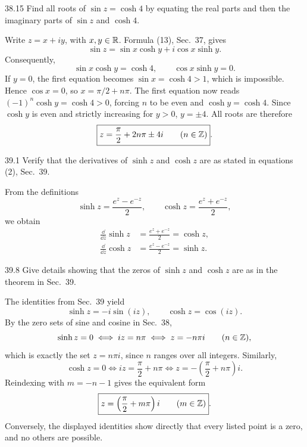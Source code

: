 \documentclass[11pt,oneside]{article}
\begin{document}
\begin{exercise}{38.15}
Find all roots of \(\sin z=\cosh4\) by equating the real parts and then the imaginary parts of \(\sin z\) and \(\cosh4\).
\end{exercise}

\begin{solution}
Write \(z=x+iy\), with \(x, y\in\mathbb{R}\). Formula (13), Sec.~37, gives
\[
    \sin z=\sin x\cosh y+i\cos x\sinh y.
\]
Consequently,
\[
    \sin x\cosh y=\cosh4,
    \qquad \cos x\sinh y=0.
\]
If \(y=0\), the first equation becomes \(\sin x=\cosh4>1\), which is impossible. Hence \(\cos x=0\), so \(x=\pi/2+n\pi\). The first equation now reads \((-1)^n\cosh y=\cosh4>0\), forcing \(n\) to be even and \(\cosh y=\cosh4\). Since \(\cosh y\) is even and strictly increasing for \(y>0\), \(y=\pm4\). All roots are therefore
\[
    \boxed{z=\frac\pi2+2n\pi\pm4i\qquad(n\in\mathbb{Z})}.
\]
\end{solution}

\begin{exercise}{39.1}
Verify that the derivatives of \(\sinh z\) and \(\cosh z\) are as stated in equations (2), Sec.~39.
\end{exercise}

\begin{solution}
From the definitions
\[
    \sinh z=\frac{e^z-e^{-z}}2,
    \qquad
    \cosh z=\frac{e^z+e^{-z}}2,
\]
we obtain
\[
\begin{aligned}
    \frac{\dd}{\dd z}\sinh z
    &=\frac{e^z+e^{-z}}2=\boxed{\cosh z}, \\
    \frac{\dd}{\dd z}\cosh z
    &=\frac{e^z-e^{-z}}2=\boxed{\sinh z}.
\end{aligned}
\]
\end{solution}

\begin{exercise}{39.8}
Give details showing that the zeros of \(\sinh z\) and \(\cosh z\) are as in the theorem in Sec.~39.
\end{exercise}

\begin{solution}
The identities from Sec.~39 yield
\[
    \sinh z=-i\sin(iz), \qquad \cosh z=\cos(iz).
\]
By the zero sets of sine and cosine in Sec.~38,
\[
    \sinh z=0\iff iz=n\pi\iff z=-n\pi i
    \qquad(n\in\mathbb{Z}),
\]
which is exactly the set \(z=n\pi i\), since \(n\) ranges over all integers. Similarly,
\[
    \cosh z=0\iff iz=\frac\pi2+n\pi
    \iff z=-\left(\frac\pi2+n\pi\right)i.
\]
Reindexing with \(m=-n-1\) gives the equivalent form
\[
    \boxed{z=\left(\frac\pi2+m\pi\right)i\qquad(m\in\mathbb{Z})}.
\]
Conversely, the displayed identities show directly that every listed point is a zero, and no others are possible.
\end{solution}
\end{document}
